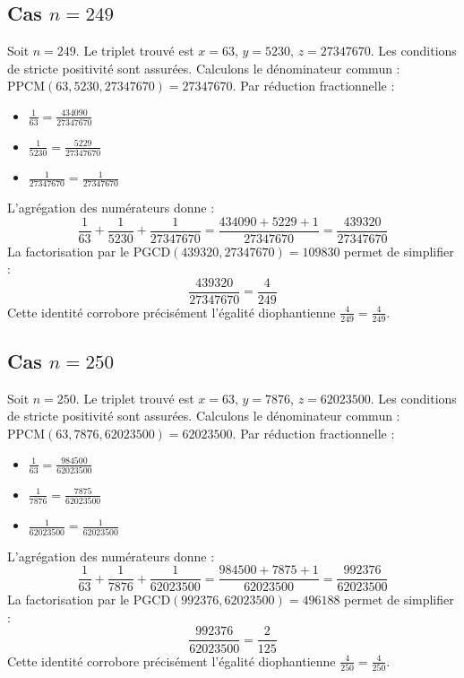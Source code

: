 \documentclass[11pt,a4paper]{article}
\begin{document}
\subsection{Cas $n = 249$}
Soit $n = 249$. Le triplet trouvé est $x = 63$, $y = 5230$, $z = 27347670$.
Les conditions de stricte positivité sont assurées.
Calculons le dénominateur commun : $\text{PPCM}(63, 5230, 27347670) = 27347670$.
Par réduction fractionnelle :
\begin{itemize}
    \item $\frac{1}{63} = \frac{434090}{27347670}$
    \item $\frac{1}{5230} = \frac{5229}{27347670}$
    \item $\frac{1}{27347670} = \frac{1}{27347670}$
\end{itemize}
L'agrégation des numérateurs donne :
$$ \frac{1}{63} + \frac{1}{5230} + \frac{1}{27347670} = \frac{434090 + 5229 + 1}{27347670} = \frac{439320}{27347670} $$
La factorisation par le $\text{PGCD}(439320, 27347670) = 109830$ permet de simplifier :
$$ \frac{439320}{27347670} = \frac{4}{249} $$
Cette identité corrobore précisément l'égalité diophantienne $\frac{4}{249} = \frac{4}{249}$.

\subsection{Cas $n = 250$}
Soit $n = 250$. Le triplet trouvé est $x = 63$, $y = 7876$, $z = 62023500$.
Les conditions de stricte positivité sont assurées.
Calculons le dénominateur commun : $\text{PPCM}(63, 7876, 62023500) = 62023500$.
Par réduction fractionnelle :
\begin{itemize}
    \item $\frac{1}{63} = \frac{984500}{62023500}$
    \item $\frac{1}{7876} = \frac{7875}{62023500}$
    \item $\frac{1}{62023500} = \frac{1}{62023500}$
\end{itemize}
L'agrégation des numérateurs donne :
$$ \frac{1}{63} + \frac{1}{7876} + \frac{1}{62023500} = \frac{984500 + 7875 + 1}{62023500} = \frac{992376}{62023500} $$
La factorisation par le $\text{PGCD}(992376, 62023500) = 496188$ permet de simplifier :
$$ \frac{992376}{62023500} = \frac{2}{125} $$
Cette identité corrobore précisément l'égalité diophantienne $\frac{4}{250} = \frac{4}{250}$.
\end{document}

